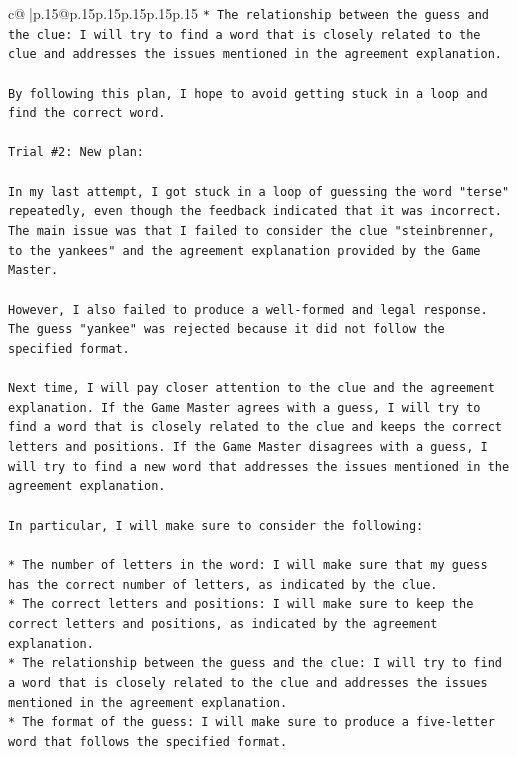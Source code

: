 \documentclass{article}
\begin{document}
{\begin{supertabular}{c@{$\;$}|p{.15\linewidth}@{}p{.15\linewidth}p{.15\linewidth}p{.15\linewidth}p{.15\linewidth}p{.15\linewidth}}
{{{\texttt{* The relationship between the guess and the clue: I will try to find a word that is closely related to the clue and addresses the issues mentioned in the agreement explanation.} \\
\\ 
\texttt{By following this plan, I hope to avoid getting stuck in a loop and find the correct word.} \\
\\ 
\texttt{Trial \#2: New plan: } \\
\\ 
\texttt{In my last attempt, I got stuck in a loop of guessing the word "terse" repeatedly, even though the feedback indicated that it was incorrect. The main issue was that I failed to consider the clue "steinbrenner, to the yankees" and the agreement explanation provided by the Game Master. } \\
\\ 
\texttt{However, I also failed to produce a well{-}formed and legal response. The guess "yankee" was rejected because it did not follow the specified format. } \\
\\ 
\texttt{Next time, I will pay closer attention to the clue and the agreement explanation. If the Game Master agrees with a guess, I will try to find a word that is closely related to the clue and keeps the correct letters and positions. If the Game Master disagrees with a guess, I will try to find a new word that addresses the issues mentioned in the agreement explanation.} \\
\\ 
\texttt{In particular, I will make sure to consider the following:} \\
\\ 
\texttt{* The number of letters in the word: I will make sure that my guess has the correct number of letters, as indicated by the clue.} \\
\texttt{* The correct letters and positions: I will make sure to keep the correct letters and positions, as indicated by the agreement explanation.} \\
\texttt{* The relationship between the guess and the clue: I will try to find a word that is closely related to the clue and addresses the issues mentioned in the agreement explanation.} \\
\texttt{* The format of the guess: I will make sure to produce a five{-}letter word that follows the specified format.} \\
\\ 
}}}
\end{supertabular}}
\end{document}
